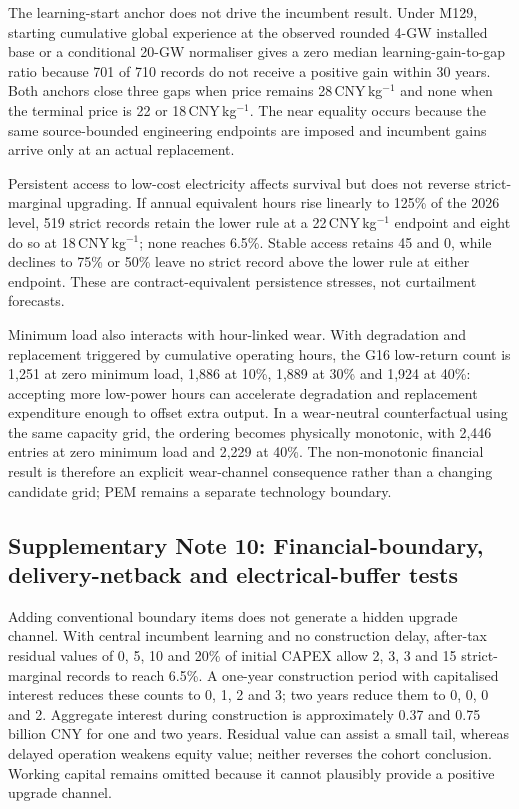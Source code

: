 \documentclass[11pt,a4paper]{article}
\begin{document}
The learning-start anchor does not drive the incumbent result. Under M129, starting cumulative global experience at the observed rounded 4-GW installed base or a conditional 20-GW normaliser gives a zero median learning-gain-to-gap ratio because 701 of 710 records do not receive a positive gain within 30 years. Both anchors close three gaps when price remains 28\,CNY\,kg$^{-1}$ and none when the terminal price is 22 or 18\,CNY\,kg$^{-1}$. The near equality occurs because the same source-bounded engineering endpoints are imposed and incumbent gains arrive only at an actual replacement.

Persistent access to low-cost electricity affects survival but does not reverse strict-marginal upgrading. If annual equivalent hours rise linearly to 125\% of the 2026 level, 519 strict records retain the lower rule at a 22\,CNY\,kg$^{-1}$ endpoint and eight do so at 18\,CNY\,kg$^{-1}$; none reaches 6.5\%. Stable access retains 45 and 0, while declines to 75\% or 50\% leave no strict record above the lower rule at either endpoint. These are contract-equivalent persistence stresses, not curtailment forecasts.

Minimum load also interacts with hour-linked wear. With degradation and replacement triggered by cumulative operating hours, the G16 low-return count is 1,251 at zero minimum load, 1,886 at 10\%, 1,889 at 30\% and 1,924 at 40\%: accepting more low-power hours can accelerate degradation and replacement expenditure enough to offset extra output. In a wear-neutral counterfactual using the same capacity grid, the ordering becomes physically monotonic, with 2,446 entries at zero minimum load and 2,229 at 40\%. The non-monotonic financial result is therefore an explicit wear-channel consequence rather than a changing candidate grid; PEM remains a separate technology boundary.

\subsection*{Supplementary Note 10: Financial-boundary, delivery-netback and electrical-buffer tests}

Adding conventional boundary items does not generate a hidden upgrade channel. With central incumbent learning and no construction delay, after-tax residual values of 0, 5, 10 and 20\% of initial CAPEX allow 2, 3, 3 and 15 strict-marginal records to reach 6.5\%. A one-year construction period with capitalised interest reduces these counts to 0, 1, 2 and 3; two years reduce them to 0, 0, 0 and 2. Aggregate interest during construction is approximately 0.37 and 0.75\,billion CNY for one and two years. Residual value can assist a small tail, whereas delayed operation weakens equity value; neither reverses the cohort conclusion. Working capital remains omitted because it cannot plausibly provide a positive upgrade channel.
\end{document}
